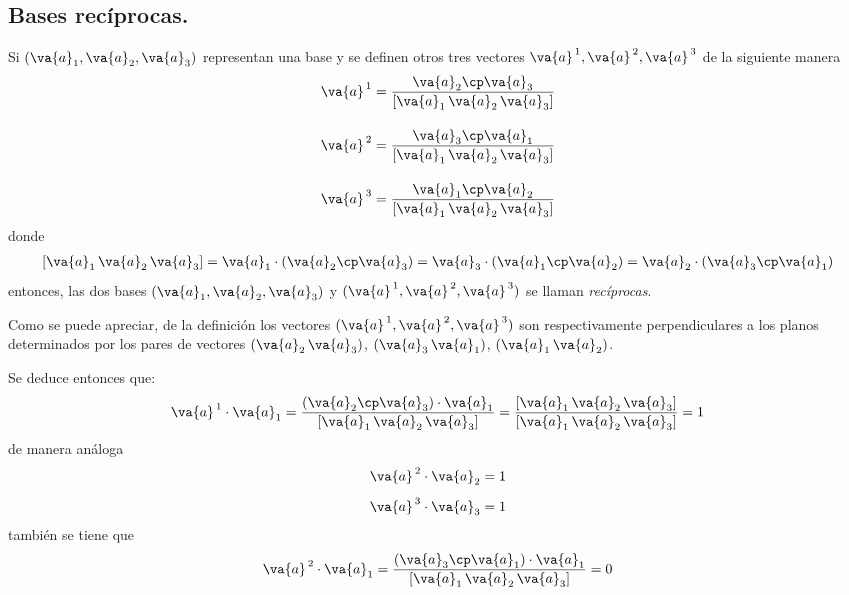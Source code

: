 \subsection{Bases recíprocas.}
Si $(\va{a}_{1}, \va{a}_{2}, \va{a}_{3})$ representan una base y se definen otros tres vectores $\va{a}^{\, 1}, \va{a}^{\, 2}, \va{a}^{\, 3}$ de la siguiente manera
\begin{align}
\begin{aligned}
\va{a}^{\, 1}&= \dfrac{\va{a}_{2} \cp \va{a}_{3}}{[\va{a}_{1} \, \va{a}_{2} \, \va{a}_{3}]} \\[1em]
\va{a}^{\, 2} &= \dfrac{\va{a}_{3} \cp \va{a}_{1}}{[\va{a}_{1} \, \va{a}_{2} \, \va{a}_{3}]}  \\[1em]
\va{a}^{\, 3} &= \dfrac{\va{a}_{1} \cp \va{a}_{2}}{[\va{a}_{1} \, \va{a}_{2} \, \va{a}_{3}]} 
\end{aligned}
\label{eq:ecuacion_02_01}
\end{align}
donde
\begin{align*}
\left[ \va{a}_{1} \, \va{a}_{2} \, \va{a}_{3} \right] = \va{a}_{1} \cdot (\va{a}_{2} \cp \va{a}_{3}) = \va{a}_{3} \cdot (\va{a}_{1} \cp \va{a}_{2}) = \va{a}_{2} \cdot (\va{a}_{3} \cp \va{a}_{1})
\end{align*}
entonces, las dos bases $(\va{a}_{1}, \va{a}_{2}, \va{a}_{3})$ y $(\va{a}^{\, 1}, \va{a}^{\, 2}, \va{a}^{\, 3})$ se llaman \emph{recíprocas}.
\par
Como se puede apreciar, de la definición los vectores $(\va{a}^{\, 1}, \va{a}^{\, 2}, \va{a}^{\, 3})$ son respectivamente perpendiculares a los planos determinados por los pares de vectores $(\va{a}_{2} \, \va{a}_{3})$,  $(\va{a}_{3} \, \va{a}_{1})$, $(\va{a}_{1} \, \va{a}_{2})$.
\par
Se deduce entonces que:
\begin{align}
\va{a}^{\, 1} \cdot \va{a}_{1} = \dfrac{(\va{a}_{2} \cp \va{a}_{3}) \cdot \va{a}_{1}}{\left[ \va{a}_{1} \, \va{a}_{2} \, \va{a}_{3} \right]} = \dfrac{\left[ \va{a}_{1} \, \va{a}_{2} \, \va{a}_{3} \right]}{\left[ \va{a}_{1} \, \va{a}_{2} \, \va{a}_{3} \right]} = 1
\label{ec:ecuacion_02_02}
\end{align}
de manera análoga
\begin{align*}
\va{a}^{\, 2} \cdot \va{a}_{2} &= 1 \\[0.5em]
\va{a}^{\, 3} \cdot \va{a}_{3} &= 1
\end{align*}
también se tiene que
\begin{align*}
\va{a}^{\, 2} \cdot \va{a}_{1} = \dfrac{(\va{a}_{3} \cp \va{a}_{1}) \cdot \va{a}_{1}}{\left[ \va{a}_{1} \, \va{a}_{2} \, \va{a}_{3} \right]} = 0
\end{align*}
